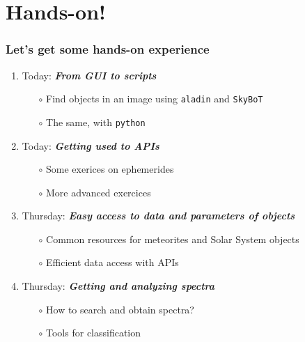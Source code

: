 \section{Hands-on!}


\begin{frame}
  \frametitle{Let's get some hands-on experience}

  \begin{enumerate}[<.->]
    \item Today: \emph{\bf From GUI to scripts}
      \begin{itemize}[<.->]
        \item[$\circ$] Find objects in an image using \texttt{aladin} and \texttt{SkyBoT}
        \item[$\circ$] The same, with \texttt{python}
      \end{itemize}
  
    \vspace{0.5em}
  \item Today: \emph{\bf Getting used to APIs}
      \begin{itemize}[<.->]
        \item[$\circ$] Some exerices on ephemerides 
        \item[$\circ$] More advanced exercices 
      \end{itemize}
 
    \vspace{0.5em}
  \item Thursday: \emph{\bf Easy access to data and parameters of objects}
      \begin{itemize}[<.->]
        \item[$\circ$] Common resources for meteorites and Solar System objects
        \item[$\circ$] Efficient data access with APIs
      \end{itemize}
  
    \vspace{0.5em}
    \item Thursday: \emph{\bf Getting and analyzing spectra}
      \begin{itemize}[<.->]
        \item[$\circ$] How to search and obtain spectra?
        \item[$\circ$] Tools for classification
      \end{itemize}

  \end{enumerate}

 \end{frame}
